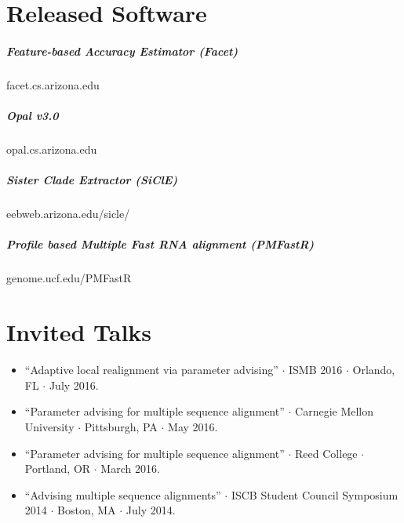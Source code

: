 \documentclass[10pt,letterpaper]{article}
\begin{document}





\section*{Released Software}

\subparagraph{Feature-based Accuracy Estimator (Facet)} 			facet.cs.arizona.edu
\subparagraph{Opal v3.0}										opal.cs.arizona.edu 
\subparagraph{Sister Clade Extractor (SiClE)}						eebweb.arizona.edu/sicle/
\subparagraph{Profile based Multiple Fast RNA alignment (PMFastR)}	genome.ucf.edu/PMFastR 


\section*{Invited Talks}

\begin{itemize}
    \item ``Adaptive local realignment via parameter advising'' $\cdot$ ISMB 2016 $\cdot$ Orlando, FL $\cdot$ July 2016.
    \item ``Parameter advising for multiple sequence alignment''  $\cdot$ Carnegie Mellon University $\cdot$ Pittsburgh, PA $\cdot$ May 2016. 
    \item ``Parameter advising for multiple sequence alignment''  $\cdot$ Reed College $\cdot$ Portland, OR $\cdot$ March 2016. 
    \item ``Advising multiple sequence alignments'' $\cdot$ ISCB Student Council Symposium 2014 $\cdot$  Boston, MA $\cdot$ July 2014.
   
\end{itemize}
\end{document}
